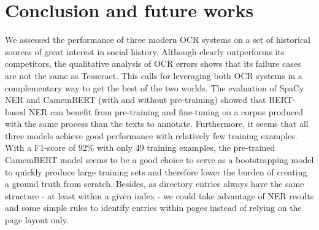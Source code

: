 \section{Conclusion and future works}
We assessed the performance of three modern OCR systems on a set of historical sources of great interest in social history.
Although \peroocr clearly outperforms its competitors, the qualitative analysis of OCR errors shows that its failure cases are not the same as Tesseract.
This calls for leveraging both OCR systems in a complementary way to get the best of the two worlds.
The evaluation of SpaCy NER and CamemBERT (with and without pre-training) showed that BERT-based NER can benefit from pre-training and fine-tuning on a corpus produced with the same process than the texts to annotate.
Furthermore, it seems that all three models achieve good performance with relatively few training examples.
With a F1-score of 92\% with only 49 training examples, the pre-trained CamemBERT model seems to be a good choice to serve as a bootstrapping model to quickly produce large training sets and therefore lower the burden of creating a ground truth from scratch.
Besides, as directory entries always have the same structure - at least within a given index - we could take advantage of NER results and some simple rules to identify entries within pages instead of relying on the page layout only.
